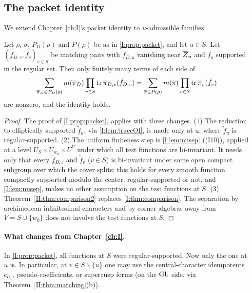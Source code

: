 \subsection{The packet identity}\label{II:subsec:packet2}
We extend Chapter~\ref{ch:I}'s packet identity to $u$-admissible families.

\begin{proposition}\label{II:prop:packet2}
Let $\rho$, $\sigma$, $P_D(\rho)$ and $P(\rho)$ be as in \cref{I:prop:packet}, and let $u\in S$. Let $(\tilde f_{D,v},\tilde f_v)_{v\in S}$ be matching pairs with $\tilde f_{D,u}$ vanishing near $\overline{Z}_u$ and $\tilde f_u$ supported in the regular set. Then only finitely many terms of each side of
\begin{equation}\label{II:eq:packet2}
\sum_{\overline{\pi}_D\in P_D(\rho)}m(\overline{\pi}_D)\prod_{v\in S}\operatorname{tr}\overline{\pi}_{D,v}(\tilde f_{D,v})=\sum_{\overline{\pi}\in P(\rho)}m(\overline{\pi})\prod_{v\in S}\operatorname{tr}\overline{\pi}_v(\tilde f_v)
\end{equation}
are nonzero, and the identity holds.
\end{proposition}
\begin{proof}
The proof of \cref{I:prop:packet}, applies with three changes. (1) The reduction to elliptically supported $\tilde f_u$, via \cref{I:lem:traceOI}, is made only at $u$, where $\tilde f_u$ is regular-supported. (2) The uniform finiteness step is \cref{I:lem:nusep} ((I10)), applied at a level $U_S\times U_{w_0}\times U^V$ under which all test functions are bi-invariant. It needs only that every $\tilde f_{D,v}$ and $\tilde f_v$ ($v\in S$) is bi-invariant under some open compact subgroup over which the cover splits; this holds for every smooth function compactly supported modulo the center, regular-supported or not, and \cref{I:lem:nusep}, makes no other assumption on the test functions at $S$. (3) Theorem~\ref{II:thm:comparison2} replaces \cref{I:thm:comparison}. The separation by archimedean infinitesimal characters and by corner algebras away from $V=S\cup\{w_0\}$ does not involve the test functions at $S$.
\end{proof}

\paragraph{What changes from Chapter~\ref{ch:I}.} In \cref{I:prop:packet}, all functions at $S$ were regular-supported. Now only the one at $u$ is. In particular, at $v\in S\smallsetminus\{u\}$ one may use the central-character idempotents $e_{U_v}$, pseudo-coefficients, or supercusp forms (on the $\mathrm{GL}$ side, via Theorem~\ref{II:thm:matching}(b)).

